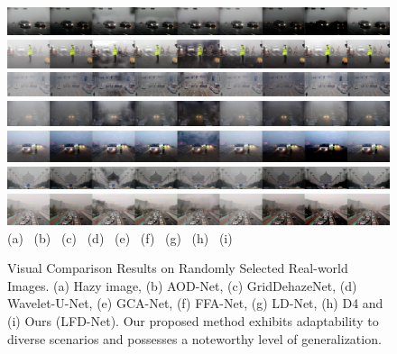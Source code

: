 \documentclass[lettersize,journal]{IEEEtran}
\begin{document}
\begin{figure}[pht]
    \centering
    \includegraphics[width=\textwidth]{own_6.jpg}
    \includegraphics[width=\textwidth]{own_8.jpg}
    \includegraphics[width=\textwidth]{own_14.jpg}
    \includegraphics[width=\textwidth]{own_16.jpg}
    \includegraphics[width=\textwidth]{own_19.jpg}
    \includegraphics[width=\textwidth]{own_24.jpg}
    \includegraphics[width=\textwidth]{own_26.jpg}
    (a) \qquad\quad\;\;\;\ (b) \qquad\quad\;\;\;\ (c) \qquad\quad\;\;\;\ (d) \qquad\quad\;\;\;\, (e) \qquad\quad\;\;\;\, (f) \qquad\quad\;\;\;\ (g) \qquad\quad\;\;\;\ (h) \qquad\quad\;\;\;\ (i)
    \caption{Visual Comparison Results on Randomly Selected Real-world Images. (a) Hazy image, (b) AOD-Net\cite{li2017aod}, (c) GridDehazeNet\cite{liu2019griddehazenet}, (d) Wavelet-U-Net\cite{yang2019wavelet}, (e) GCA-Net\cite{chen2019gated}, (f) FFA-Net\cite{qin2020ffa}, (g) LD-Net\cite{ullah2021light}, (h) D4\cite{yang2022d4} and (i) Ours (LFD-Net). Our proposed method exhibits adaptability to diverse scenarios and possesses a noteworthy level of generalization.}
    \label{own}
\end{figure}
\end{document}
